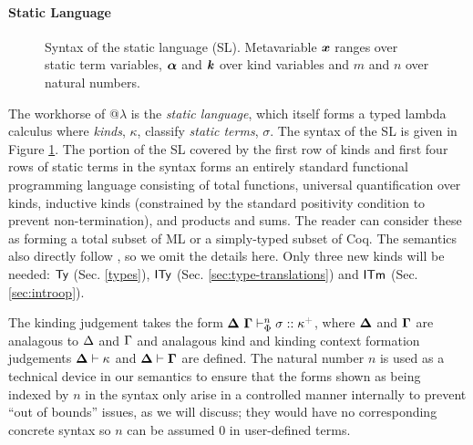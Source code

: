\documentclass[10pt,preprint]{sigplanconf}
\newcommand{\moutput}{^{\color{gray}+}}
\begin{document}
\paragraph{Static Language}
\begin{figure}[t]
\small
\hspace{-5px}
\caption{Syntax of the static language (SL). Metavariable ${\textbf{\textit{x}}}$ ranges over static term variables, $\boldsymbol{\alpha}$ and $\textbf{\textit{k}}$ over kind variables and $m$ and $n$ over natural numbers.}
\label{syntax-SL}
\end{figure}
The workhorse of @$\lambda$ is the \emph{static language}, which itself forms a typed lambda calculus where 
\emph{kinds}, $\kappa$, classify \emph{static terms}, $\sigma$.  The syntax of the SL is given in Figure \ref{syntax-SL}. The portion of the SL covered by the first row of kinds and first four rows of static terms in the syntax forms an entirely standard  functional programming language consisting of total functions, universal quantification over kinds, inductive kinds (constrained by the standard positivity condition to prevent non-termination), and products and sums. The reader can consider these as forming a total subset of ML or a simply-typed subset of Coq. The semantics also directly follow \cite{pfpl}, so we  omit the details here.  Only three new  kinds will be needed: ${\sf Ty}$ (Sec. \ref{types}), ${\sf ITy}$ (Sec. \ref{sec:type-translations}) and ${\sf ITm}$ (Sec. \ref{sec:introop}). 

The kinding judgement takes the form $\sofkX{\st}{\kappa\moutput}$, where $\boldsymbol\Delta$ and $\boldsymbol\Gamma$ are analagous to $\Delta$ and $\Gamma$ and analagous kind and kinding context formation judgements $\boldsymbol\Delta \vdash \kappa$ and $\boldsymbol\Delta \vdash \boldsymbol\Gamma$ are  defined. The natural number $n$ is used as a technical device in our semantics to ensure that the forms shown as being indexed by $n$ in the syntax only arise in a controlled manner internally to prevent ``out of bounds'' issues, as we will discuss; they would have no corresponding concrete syntax so $n$ can be assumed $0$ in user-defined terms. 
\end{document}
